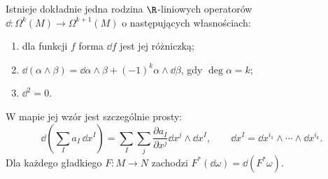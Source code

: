 \begin{twierdzenie}
\label{thm:formy-d}
Istnieje dokładnie jedna rodzina $\R$-liniowych
operatorów $\dd:\Omega^k(M)\to\Omega^{k+1}(M)$
o następujących własnościach:
\begin{enumerate}[leftmargin=*]
\item dla funkcji $f$ forma $\dd f$ jest jej różniczką;
\item $\dd(\alpha\wedge\beta)=\dd\alpha\wedge\beta
 +(-1)^k\alpha\wedge\dd\beta$, gdy $\deg\alpha=k$;
\item $\dd^2=0$.
\end{enumerate}
W mapie jej wzór jest szczególnie prosty:
\begin{equation}\label{eq:zewnetrzna-lokalnie}
 \dd\!\left(\sum_I a_I\,\dd x^I\right)
  =\sum_I\sum_j\frac{\partial a_I}{\partial x^j}
     \dd x^j\wedge\dd x^I,
 \qquad \dd x^I=\dd x^{i_1}\wedge\cdots\wedge\dd x^{i_k}.
\end{equation}
Dla każdego gładkiego $F:M\to N$ zachodzi
$F^*(\dd\omega)=\dd(F^*\omega)$.
\end{twierdzenie}
